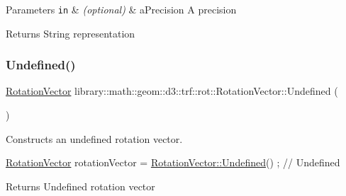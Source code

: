 \begin{DoxyParams}[1]{Parameters}
\mbox{\tt in}  & {\em (optional)} & a\+Precision A precision \\
\hline
\end{DoxyParams}
\begin{DoxyReturn}{Returns}
String representation 
\end{DoxyReturn}
\mbox{\label{classlibrary_1_1math_1_1geom_1_1d3_1_1trf_1_1rot_1_1_rotation_vector_a4ab50dc44c938485c102c4c70006c04b}} 
\subsubsection{\texorpdfstring{Undefined()}{Undefined()}}
{\footnotesize\ttfamily \hyperlink{classlibrary_1_1math_1_1geom_1_1d3_1_1trf_1_1rot_1_1_rotation_vector}{Rotation\+Vector} library\+::math\+::geom\+::d3\+::trf\+::rot\+::\+Rotation\+Vector\+::\+Undefined (\begin{DoxyParamCaption}{ }\end{DoxyParamCaption})\hspace{0.3cm}{\ttfamily [static]}}



Constructs an undefined rotation vector. 


\begin{DoxyCode}
\hyperlink{classlibrary_1_1math_1_1geom_1_1d3_1_1trf_1_1rot_1_1_rotation_vector_a49076a279f457fdb14c4a9d4d61e1738}{RotationVector} rotationVector = \hyperlink{classlibrary_1_1math_1_1geom_1_1d3_1_1trf_1_1rot_1_1_rotation_vector_a4ab50dc44c938485c102c4c70006c04b}{RotationVector::Undefined}() ; \textcolor{comment}{//
       Undefined}
\end{DoxyCode}


\begin{DoxyReturn}{Returns}
Undefined rotation vector 
\end{DoxyReturn}
\mbox{\label{classlibrary_1_1math_1_1geom_1_1d3_1_1trf_1_1rot_1_1_rotation_vector_ae8dcd99b54ffcffee6906b526a8d2769}} 
